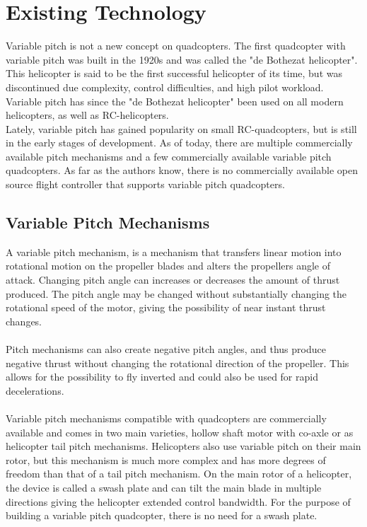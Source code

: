 \chapter{Existing Technology}

Variable pitch is not a new concept on quadcopters. The first quadcopter with variable pitch was built in the 1920s and was called the "de Bothezat helicopter". This helicopter is said to be the first successful helicopter of its time, but was discontinued due complexity, control difficulties, and high pilot workload. \cite{bothezat}
Variable pitch has since the "de Bothezat helicopter" been used on all modern helicopters, as well as RC-helicopters. \\

Lately, variable pitch has gained popularity on small RC-quadcopters, but is still in the early stages of development. As of today, there are multiple commercially available pitch mechanisms and a few commercially available variable pitch quadcopters. As far as the authors know, there is no commercially available open source flight controller that supports variable pitch quadcopters.

\section{Variable Pitch Mechanisms}

A variable pitch mechanism, is a mechanism that transfers linear motion into rotational motion on the propeller blades and alters the propellers angle of attack. Changing pitch angle can increases or decreases the amount of thrust produced. The pitch angle may be changed without substantially changing the rotational speed of the motor, giving the possibility of near instant thrust changes. \\
\\
Pitch mechanisms can also create negative pitch angles, and thus produce negative thrust without changing the rotational direction of the propeller. This allows for the possibility to fly inverted and could also be used for rapid decelerations.\\
\\
Variable pitch mechanisms compatible with quadcopters are commercially available and comes in two main varieties, hollow shaft motor with co-axle or as helicopter tail pitch mechanisms. Helicopters also use variable pitch on their main rotor, but this mechanism is much more complex and has more degrees of freedom than that of a tail pitch mechanism. On the main rotor of a helicopter, the device is called a swash plate and can tilt the main blade in multiple directions giving the helicopter extended control bandwidth. For the purpose of building a variable pitch quadcopter, there is no need for a swash plate.

